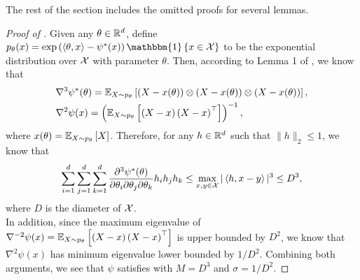 The rest of the section includes the omitted proofs for several lemmas.
\begin{proof}[Proof of ]
    Given any $\theta\in\mathbb{R}^d$, define $p_{\theta}(x) = \exp\rbr{\innerp{\theta}{x}-\psi^*(x)}\mathbbm{1}\cbr{x\in\calX}$ to be the exponential distribution over ${\mathcal{X}}$ with parameter $\theta$. Then, according to Lemma 1 of \citet{bubeck2014entropic}, we know that
\begin{align*}
    &\nabla^3\psi^*(\theta) 
    = \mathbb{E}_{X\sim p_\theta}\left[\left(X-x(\theta)\right)\otimes\left(X-x(\theta)\right)\otimes\left(X-x(\theta)\right)\right],\\
    &\nabla^2\psi(x)=\left(\mathbb{E}_{X\sim p_\theta}\left[\left(X-x\right)\left(X-x\right)^\top\right]\right)^{-1},
\end{align*}
where $x(\theta)=\mathbb{E}_{X\sim p_{\theta}}\left[X\right]$. 
Therefore, for any $h\in\mathbb{R}^d$ such that $\|h\|_2\leq 1$, we know that
\begin{align*}
    \sum_{i=1}^d\sum^d_{j=1}\sum^d_{k=1}\frac{\partial^3\psi^*(\theta)}{\partial \theta_i\partial \theta_j\partial \theta_k}h_ih_jh_k \leq \max_{x,y\in{\mathcal{X}}}|\left\langle {h,x-y} \right\rangle|^3\leq D^3,
\end{align*}
where $D$ is the diameter of ${\mathcal{X}}$. \\In addition, since the maximum eigenvalue of $\nabla^{-2}\psi(x)=\mathbb{E}_{X\sim p_\theta}\left[\left(X-x\right)\left(X-x\right)^\top\right]$ is upper bounded by $D^2$, we know that $\nabla^2\psi(x)$ has minimum eigenvalue lower bounded by $1/D^2$. Combining both arguments, we see that $\psi$ satisfies  with $M=D^3$ and $\sigma=1/D^2$. 
\end{proof}


